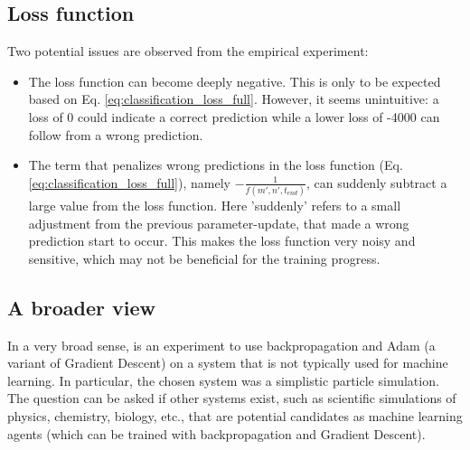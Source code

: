 \subsection{Loss function}
Two potential issues are observed from the empirical experiment:
\begin{itemize}
	\item The loss function can become deeply negative. 
		This is only to be expected based on Eq.  \ref{eq:classification_loss_full}.
		However, it seems unintuitive: a loss of 0 could indicate a correct prediction 
		while a lower loss of -4000 can follow from a wrong prediction. 
	\item The term that penalizes wrong predictions in the loss function (Eq. \ref{eq:classification_loss_full}), 
		namely $ -\frac{1}{f(m', n', t_{end})}$, can suddenly subtract a large value from the loss function.
		Here 'suddenly' refers to a small adjustment from the previous parameter-update,
		that made a wrong prediction start to occur.
		This makes the loss function very noisy and sensitive, 
		which may not be beneficial for the training progress.
\end{itemize}

\subsection{A broader view}
In a very broad sense, \nenwin is an experiment to use backpropagation and Adam (a variant of Gradient Descent)
on a system that is not typically used for machine learning. 
In particular, the chosen system was a simplistic particle simulation. 
The question can be asked if other systems exist, 
such as scientific simulations of physics, chemistry, biology, etc., 
that are potential candidates as machine learning agents 
(which can be trained with backpropagation and Gradient Descent).